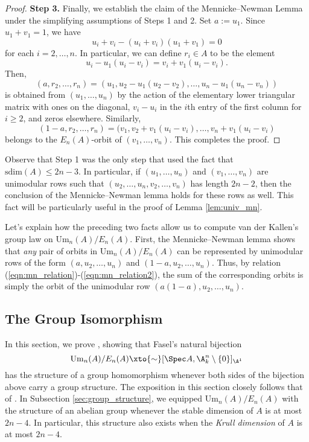 \begin{proof}
    \textbf{Step 3.} Finally, we establish the claim of the Mennicke--Newman Lemma under the simplifying assumptions of Steps 1 and 2. Set $a := u_1$. Since $u_1 + v_1 = 1$, we have
    \[
    u_i + v_i - (u_i + v_i)(u_1 + v_1) = 0
    \]
    for each $i = 2,\ldots,n$. In particular, we can define $r_i \in A$ to be the element 
    \[
    u_i - u_1(u_i-v_i) = v_i + v_1(u_i-v_i). 
    \]
    Then, \[(a,r_2,\ldots,r_n) = (u_1,u_2-u_1(u_2-v_2), \ldots,u_n-u_1(u_n-v_n))\] is obtained from $(u_1,\ldots,u_n)$ by the action of the elementary lower triangular matrix with ones on the diagonal, $v_i-u_i$ in the $i$th entry of the first column for $i \geq 2$, and zeros elsewhere. Similarly, \[(1-a,r_2,\ldots,r_n) = (v_1,v_2 + v_1(u_i-v_i), \ldots,v_n + v_1(u_i-v_i)\] belongs to the $E_n(A)$-orbit of $(v_1,\ldots,v_n)$. This completes the proof.
\end{proof}

\begin{remark}\label{rem:no_dim_assumption}
    Observe that Step 1 was the only step that used the fact that $\mathrm{sdim}(A) \leq 2n-3$. In particular, if $(u_1,\ldots,u_n)$ and $(v_1,\ldots,v_n)$ are unimodular rows such that $(u_2,\ldots,u_n,v_2,\ldots,v_n)$ has length $2n-2$, then the conclusion of the Mennicke--Newman lemma holds for these rows as well. This fact will be particularly useful in the proof of Lemma \ref{lem:univ_mn}.
\end{remark}

Let's explain how the preceding two facts allow us to compute van der Kallen's group law on $\mathrm{Um}_n(A)/E_n(A)$. First, the Mennicke--Newman lemma shows that \textit{any} pair of orbits in $\mathrm{Um}_n(A)/E_n(A)$ can be represented by unimodular rows of the form $(a,u_2,\ldots,u_n)$ and $(1-a,u_2,\ldots,u_n)$. Thus, by relation (\ref{eqn:mn_relation})-(\ref{eqn:mn_relation2}), the sum of the corresponding orbits is simply the orbit of the unimodular row $(a(1-a),u_2,\ldots,u_n)$. 

\subsection{The Group Isomorphism}\label{sec:lerbet}

In this section, we prove \cite[Theorem 5.1]{LERBET2024109415}, showing that Fasel's natural bijection 
\[
\mathrm{Um}_n(A)/E_n(A) \xto{\sim} [\Spec A, \A^n_k\setminus\{0\}]_{\A^1}
\]
has the structure of a group homomorphism whenever both sides of the bijection above carry a group structure. The exposition in this section closely follows that of \cite[Section 5]{LERBET2024109415}. In Subsection \ref{sec:group_structure}, we equipped $\mathrm{Um}_n(A)/E_n(A)$ with the structure of an abelian group whenever the stable dimension of $A$ is at most $2n-4$. In particular, this structure also exists when the \textit{Krull dimension} of $A$ is at most $2n-4$. 

